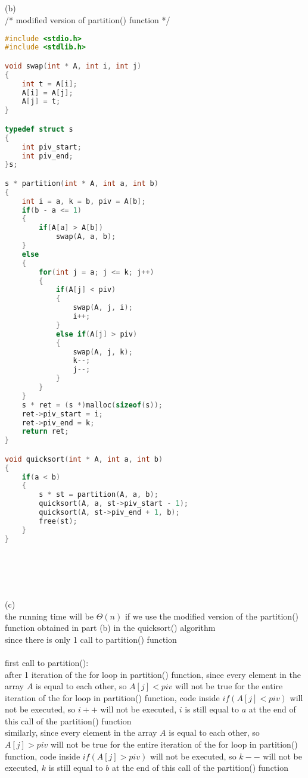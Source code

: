 \documentclass[12pt,border=4pt,multi]{article}%
\begin{document}
\\
\\
\\
\\
\newpage
\noindent
(b)\\
/* modified version of partition() function */
\begin{lstlisting}[language = c]
#include <stdio.h>
#include <stdlib.h>

void swap(int * A, int i, int j)
{
    int t = A[i];
    A[i] = A[j];
    A[j] = t;
}

typedef struct s
{
    int piv_start;
    int piv_end;
}s; 

s * partition(int * A, int a, int b)
{
    int i = a, k = b, piv = A[b];
    if(b - a <= 1)
    {
        if(A[a] > A[b])
            swap(A, a, b);
    }
    else
    {
        for(int j = a; j <= k; j++)
        {
            if(A[j] < piv)
            {
                swap(A, j, i);
                i++;
            }
            else if(A[j] > piv)
            {
                swap(A, j, k);
                k--;
                j--;
            }
        }
    }
    s * ret = (s *)malloc(sizeof(s));
    ret->piv_start = i;
    ret->piv_end = k;
    return ret; 
}

void quicksort(int * A, int a, int b)
{
    if(a < b)    
    {
        s * st = partition(A, a, b);
        quicksort(A, a, st->piv_start - 1);
        quicksort(A, st->piv_end + 1, b);
        free(st);
    }   
}
\end{lstlisting}
\leavevmode
\\
\\
\\
\\
(c)\\
the running time will be $\Theta(n)$ if we use the modified version of the partition() function obtained in part (b) in the quicksort() algorithm\\
since there is only 1 call to partition() function\\
\\
first call to partition():\\
after 1 iteration of the for loop in partition() function, since every element in the array $A$ is equal to each other, so $A[j] < piv$ will not be true for the entire iteration of the for loop in partition() function, code inside $if(A[j] < piv)$ will not be executed, so $i++$ will not be executed, $i$ is still equal to $a$ at the end of this call of the partition() function\\
similarly, since every element in the array $A$ is equal to each other, so $A[j] > piv$ will not be true for the entire iteration of the for loop in partition() function, code inside $if(A[j] > piv)$ will not be executed, so $k--$ will not be executed, $k$ is still equal to $b$ at the end of this call of the partition() function\\
\end{document}
